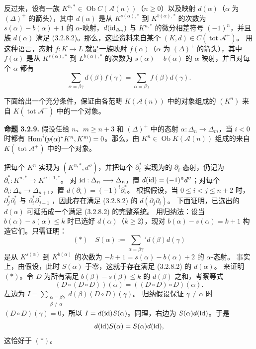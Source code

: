 反过来，设有一族
$K^{n,*}\in\operatorname{Ob}C(\mathcal A(n))$（$n\geq0$）以及映射
$d(\alpha)$（$\alpha$ 为 $(\Delta)^+$ 的箭头），其中 $d(\alpha)$ 是从
$K^{s(\alpha),*}$ 到 $K^{b(\alpha),*}$ 的次数为
$s(\alpha)-b(\alpha)+1$ 的 $\alpha$-映射，$d(\operatorname{id}_{\Delta_n})$
与 $K^{n,*}$ 的微分相差符号 $(-1)^n$，并且族 $d(\alpha)$ 满足
(3.2.8.2)。那么，这些资料来自某个
$(K,d)\in C(\operatorname{tot}\mathcal A^+)$。
用这种语言，态射 $f:K\longrightarrow L$ 就是一族映射
$f(\alpha)$（$\alpha$ 为 $(\Delta)^+$ 的箭头），其中 $f(\alpha)$ 是从
$K^{s(\alpha),*}$ 到 $L^{b(\alpha),*}$ 的次数为
$s(\alpha)-b(\alpha)$ 的 $\alpha$-映射，并且对每个 $\alpha$ 都有
\begin{equation*}
\sum_{\alpha=\beta\gamma}d(\beta)f(\gamma)
 =\sum_{\alpha=\beta\gamma}f(\beta)d(\gamma).
\tag{3.2.8.3}
\end{equation*}

下面给出一个充分条件，保证由各范畴 $K(\mathcal A(n))$ 中的对象组成的 $(K^n)$ 来自 $K(\operatorname{tot}\mathcal A^+)$ 中的一个对象。

\par\medskip\noindent\textbf{命题 3.2.9.}
假设任给 $n$、$m\geq n+3$ 和 $(\Delta)^+$ 中的态射
$\alpha:\Delta_n\longrightarrow\Delta_m$，当 $i<0$ 时都有
$\operatorname{Hom}^i(p(\alpha)^*K^n,K^m)=0$。那么，由
$K^n\in\operatorname{Ob}K(\mathcal A(n))$ 组成的来自
$K(\operatorname{tot}\mathcal A^+)$ 中的一个对象。

把每个 $K^n$ 实现为 $(K^{n,*},d'')$，并把每个 $\partial_i^*$ 实现为的 $\partial_i$-态射，仍记为
$\partial_i^*:K^{n,*}\longrightarrow K^{n+1,*}$。
对 $\operatorname{id}:\Delta_n\longrightarrow\Delta_n$，置
$d(\operatorname{id})=(-1)^nd''$；对每个
$\partial_i:\Delta_n\longrightarrow\Delta_{n+1}$，置
$d(\partial_i)=(-1)^i\partial_i^*$。
根据假设，当 $0\leq i<j\leq n+2$ 时，
$\partial_j^*\partial_i^*$ 与 $\partial_i^*\partial_{j-1}^*$ ，因此存在满足 (3.2.8.2) 的 $d(\partial_j\partial_i)$。
下面证明，已选出的 $d(\alpha)$ 可延拓成一个满足 (3.2.8.2) 的完整系统。
用归纳法：设当 $b(\alpha)-s(\alpha)\leq k$ 时已选好 $d(\alpha)$（$k\geq2$），现对 $b(\alpha)-s(\alpha)=k+1$ 构造它们。只需证明：
\[
(*)\quad S(\alpha):=\sum_{\alpha=\beta\gamma}'d(\beta)d(\gamma)
\]
是从 $K^{s(\alpha)}$ 到 $K^{b(\alpha)}$ 的次数为
$-k+1=s(\alpha)-b(\alpha)+2$ 的 $\alpha$-态射。
事实上，由假设，此时 $S(\alpha)$ 于零，这就于存在满足
(3.2.8.2) 的 $d(\alpha)$。
来证明 $(*)$。令 $D$ 为所有满足
$b(\beta)-s(\beta)\leq k$ 的 $d(\beta)$ 之和，考察等式
\[
(D\circ(D\circ D))(\alpha)=((D\circ D)\circ D)(\alpha).
\]
左边为
$I=\sum_{\substack{\alpha=\beta\gamma\\\beta\ne\alpha}}d(\beta)(D\circ D)(\gamma)$。
归纳假设保证 $\gamma\ne\alpha$ 时 $(D\circ D)(\gamma)=0$，所以
$I=d(\operatorname{id})S(\alpha)$。同理，右边为 $S(\alpha)d(\operatorname{id})$。于是
\[
d(\operatorname{id})S(\alpha)=S(\alpha)d(\operatorname{id}),
\]
这恰好于 $(*)$。

